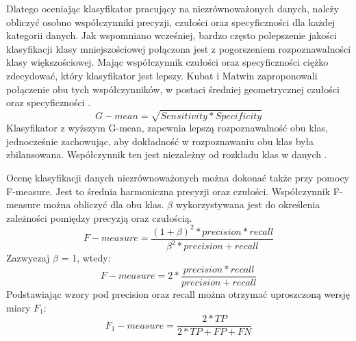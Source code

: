 Dlatego oceniając klasyfikator pracujący na niezrównoważonych danych, należy obliczyć osobno współczynniki precyzji, czułości oraz specyficzności dla każdej kategorii danych. Jak wspomniano wcześniej, bardzo często polepszenie jakości klasyfikacji klasy mniejszościowej połączona jest z pogorszeniem rozpoznawalności klasy większościowej. Mając współczynnik czułości oraz specyficzności ciężko zdecydować, który klasyfikator jest lepszy. Kubat i Matwin zaproponowali połączenie obu tych współczynników, w postaci średniej geometrycznej czułości oraz specyficzności \cite{KubatMatwin}. 
\[G-mean = \sqrt{Sensitivity*Specificity}\]
Klasyfikator z wyższym G-mean, zapewnia lepszą rozpoznawalność obu klas, jednocześnie zachowując, aby dokładność w rozpoznawaniu obu klas była zbilansowana. Współczynnik ten jest niezależny od rozkładu klas w danych \cite{Garcia}. \par
Ocenę klasyfikacji danych niezrównoważonych można dokonać także przy pomocy F-measure. Jest to średnia harmoniczna precyzji oraz czułości. Współczynnik F-measure można obliczyć dla obu klas. $\beta$ wykorzystywana jest do określenia zależności pomiędzy precyzją oraz czułością.
\[F-measure= \frac{(1+\beta)^2*precision*recall}{\beta^2*precision+recall}\]
Zazwyczaj $\beta$ = 1, wtedy:
\[F-measure= 2*\frac{precision*recall}{precision+recall}\]
Podstawiając wzory pod precision oraz recall można otrzymać uproszczoną wersję miary $F_1$:
\[F_1-measure= \frac{2*TP}{2*TP+FP+FN}\]

